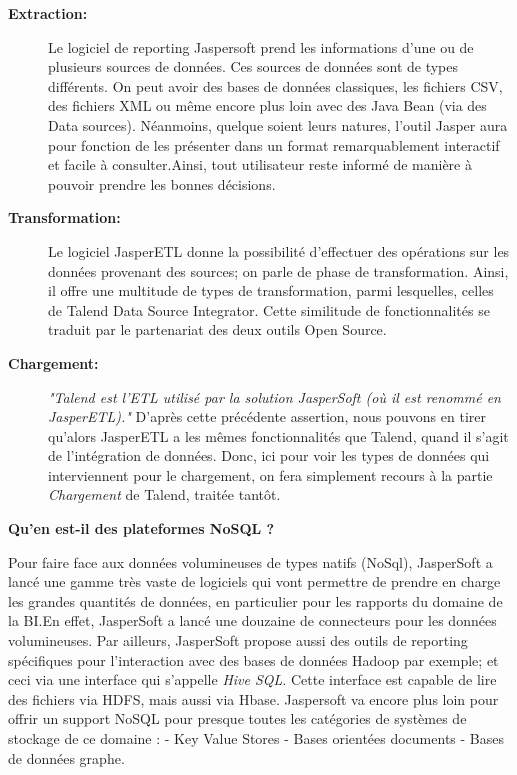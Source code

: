 \documentclass[12pt,a4wide,twoside]{report}
\begin{document}
\begin{description}
	\item[\textbf{Extraction:}] 
		Le logiciel de reporting Jaspersoft prend les informations d’une ou de plusieurs sources de données. Ces sources de données sont de types différents. On peut avoir des bases de données classiques, les fichiers CSV, des fichiers XML ou même encore plus loin avec  des Java Bean (via des Data sources).\newline
		 Néanmoins, quelque soient leurs natures, l'outil Jasper aura pour fonction de les présenter dans un format remarquablement interactif et facile à consulter.\newline Ainsi, tout utilisateur reste informé de manière à pouvoir prendre les bonnes décisions.

	\item[\textbf{Transformation:}] 
	Le logiciel JasperETL donne la possibilité d'effectuer des opérations sur les données provenant des sources; on parle de phase de transformation.\newline
	Ainsi, il offre une multitude de types de transformation, parmi lesquelles, celles de Talend Data Source Integrator. Cette similitude de fonctionnalités se traduit par le partenariat des deux outils Open Source.


	\item[\textbf{Chargement:}]
	\emph{"Talend est l’ETL utilisé par la solution JasperSoft (où il est renommé en JasperETL)."}\cite{misc1}\newline
	D'après cette précédente assertion, nous pouvons en tirer qu'alors JasperETL a les mêmes fonctionnalités que Talend, quand il s'agit de l'intégration de données. Donc, ici pour voir les types de données qui interviennent pour le chargement, on fera simplement recours à la partie \emph{Chargement} de Talend, traitée tantôt.
	
\end{description}
\textbf{Qu'en est-il des plateformes NoSQL ?} \newline

Pour faire face aux données volumineuses de types natifs (NoSql), JasperSoft a lancé une gamme très vaste de logiciels qui vont permettre de prendre en charge les grandes quantités de données, en particulier pour les rapports du domaine de la BI.\newline En effet, JasperSoft a lancé une douzaine de connecteurs pour les données volumineuses. Par ailleurs, JasperSoft propose aussi des outils de reporting spécifiques pour l'interaction avec des bases de données Hadoop par exemple; et ceci via une interface qui s'appelle \emph{Hive SQL}.\cite{art1} Cette interface est capable de lire des fichiers via HDFS, mais aussi via Hbase.\newline
Jaspersoft va encore plus loin pour offrir un support NoSQL pour presque toutes les catégories de systèmes de stockage de ce domaine :\newline
 - Key Value Stores \newline
 - Bases orientées documents \newline	
 - Bases de données graphe.
 
\end{document}
